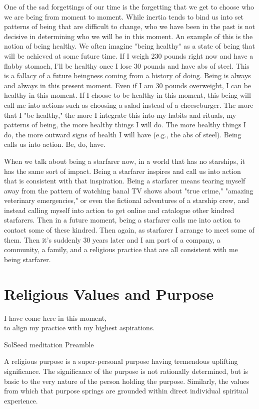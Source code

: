 \documentclass[ebook,12pt,openany,twoside]{memoir}
\begin{document}
One of the sad forgettings of our time is the forgetting that we get to choose
who we are being from moment to moment. While inertia tends to bind us into set
patterns of being that are difficult to change, who we have been in the past is
not decisive in determining who we will be in this moment. An example of this
is the notion of being healthy. We often imagine "being healthy" as a state of
being that will be achieved at some future time. If I weigh 230 pounds right
now and have a flabby stomach, I'll be healthy once I lose 30 pounds and have
abs of steel. This is a fallacy of a future beingness coming from a history of
doing. Being is always and always in this present moment. Even if I am 30
pounds overweight, I can be healthy in this moment. If I choose to be healthy
in this moment, this being will call me into actions such as choosing a salad
instead of a cheeseburger. The more that I "be healthy," the more I integrate
this into my habits and rituals, my patterns of being, the more healthy things
I will do. The more healthy things I do, the more outward signs of health I
will have (e.g., the abs of steel). Being calls us into action. Be, do, have.

When we talk about being a starfarer now, in a world that has no starships, it
has the same sort of impact. Being a starfarer inspires and call us into action
that is consistent with that inspiration. Being a starfarer means tearing
myself away from the pattern of watching banal TV shows about "true crime,"
"amazing veterinary emergencies," or even the fictional adventures of a
starship crew, and instead calling myself into action to get online and
catalogue other kindred starfarers. Then in a future moment, being a starfarer
calls me into action to contact some of these kindred. Then again, as starfarer
I arrange to meet some of them. Then it's suddenly 30 years later and I am part
of a company, a community, a family, and a religious practice that are all
consistent with me being starfarer.

\chapter{Religious Values and Purpose}

\setlength\epigraphwidth{3.3in}
\epigraph{
  I have come here in this moment,\\
  to align my practice with my highest aspirations.\\
}{SolSeed meditation Preamble}

A religious purpose is a super-personal purpose having tremendous uplifting
significance. The significance of the purpose is not rationally determined, but
is basic to the very nature of the person holding the purpose. Similarly, the
values from which that purpose springs are grounded within direct individual
spiritual experience.
\end{document}
